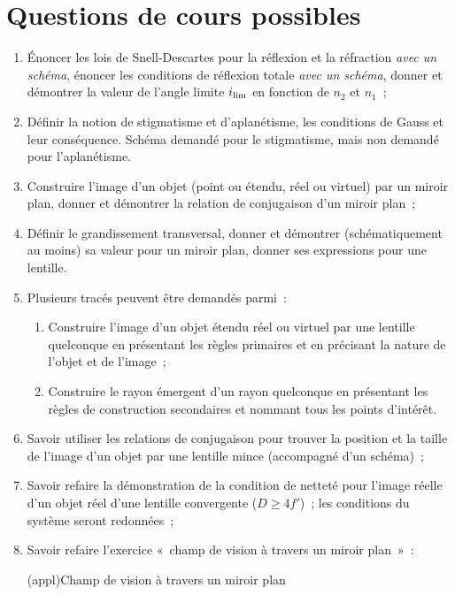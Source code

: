 \documentclass[a4paper, 12pt, final, garamond]{book}
\begin{document}
\section{Questions de cours possibles}
\begin{enumerate}
	\item Énoncer les lois de Snell-Descartes pour la réflexion et la réfraction
	      \textit{avec un schéma}, énoncer les conditions de réflexion totale
	      \textit{avec un schéma}, donner et démontrer la valeur de l'angle limite
	      $i_{\rm lim}$ en fonction de $n_2$ et $n_1$~;
	\item Définir la notion de stigmatisme et d'aplanétisme, les conditions de
	      Gauss et leur conséquence. Schéma demandé pour le stigmatisme, mais non
	      demandé pour l'aplanétisme.
	\item Construire l'image d'un objet (point ou étendu, réel ou virtuel) par
	      un miroir plan, donner et démontrer la relation de conjugaison d'un
	      miroir plan~;
	\item Définir le grandissement transversal, donner et démontrer
	      (schématiquement au moins) sa valeur pour un miroir plan, donner ses
	      expressions pour une lentille.
	\item Plusieurs tracés peuvent être demandés parmi~:
	      \begin{enumerate}
		      \item Construire l'image d'un objet étendu réel ou virtuel par une
		            lentille quelconque en présentant les règles primaires et en
		            précisant la nature de l'objet et de l'image~;
		      \item Construire le rayon émergent d'un rayon quelconque en
		            présentant les règles de construction secondaires et nommant
		            tous les points d'intérêt.
	      \end{enumerate}
	\item Savoir utiliser les relations de conjugaison pour trouver la position
	      et la taille de l'image d'un objet par une lentille mince (accompagné
	      d'un schéma)~;
	\item Savoir refaire la démonstration de la condition de netteté pour
	      l'image réelle d'un objet réel d'une lentille convergente ($D \geq
		      4f'$)~; les conditions du système seront redonnées~;
	\item Savoir refaire l'exercice «~champ de vision à travers un miroir
	      plan~»~:
	      \begin{tcb}(appl){Champ de vision à travers un miroir plan}

\end{tcb}
\end{enumerate}
\end{document}

